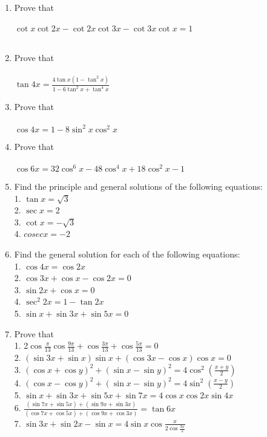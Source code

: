 \begin{enumerate}[label=\arabic*.,ref=\thesubsection.\theenumi]
\item Prove that\\
\\$\cot x\cot2x-\cot2x\cot3x-\cot3x\cot x=1$\\\\

\item Prove that\\
\\$\tan4x=\frac{4\tan x(1-\tan^{2}x)}{1-6\tan^{2}x+\tan^{4}x}$\\

\item Prove that\\
\\$\cos4x=1-8\sin^{2}x\cos^{2}x$\\

\item Prove that\\
\\$\cos6x=32\cos^{6}x-48\cos^{4}x+18\cos^{2}x-1$\\

\item Find the principle and general solutions of the following equations:\\
1. $\tan x=\sqrt 3$\\
2. $\sec x=2$\\
3. $\cot x=-\sqrt 3$\\
4. $cosec x=-2$\\

\item Find the general solution for each of the following equations:\\
1. $\cos4x=\cos2x$\\
2. $\cos3x+\cos x-\cos2x=0$\\
3. $\sin2x+\cos x=0$\\
4. $\sec^{2}2x=1-\tan2x$\\
5. $\sin x+\sin3x+\sin5x=0$\\

\item Prove that\\
1. 2$\cos\frac{\pi}{13}\cos\frac{9\pi}{13}+\cos\frac{3\pi}{13}+\cos\frac{5\pi}{13}=0$\\
2. $(\sin3x+\sin x)\sin x+(\cos3x-\cos x)\cos x=0$\\
3. $(\cos x+\cos y)^{2}+(\sin x-\sin y)^{2}=4\cos^{2}(\frac{x+y}{2})$\\
4. $(\cos x-\cos y)^{2}+(\sin x-\sin y)^{2}=4\sin^{2}(\frac{x-y}{2})$\\
5. $\sin x+\sin3x+\sin5x+\sin7x=4\cos x\cos2x\sin4x$\\
6. $\frac{(\sin7x+\sin5x)+(\sin9x+\sin3x)}{(\cos7x+\cos5x)+(\cos9x+\cos3x)}=\tan6x$\\
7. $\sin3x+\sin2x-\sin x=4\sin x\cos\frac{x}{2\cos\frac{3x}{2}}$\\


\end{enumerate}
